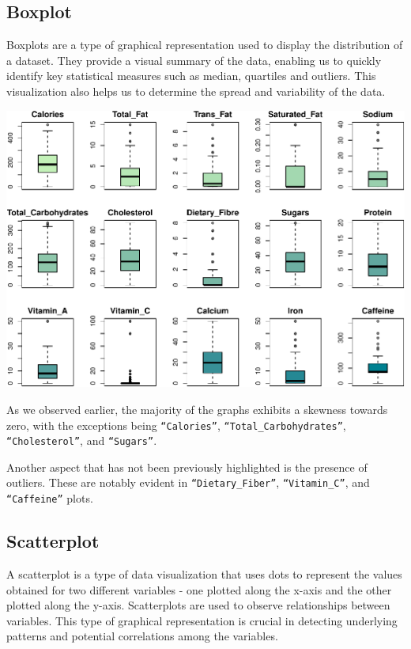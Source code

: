 \documentclass[
]{article}
\begin{document}
\subsection{Boxplot}\label{boxplot}

Boxplots are a type of graphical representation used to display the
distribution of a dataset. They provide a visual summary of the data,
enabling us to quickly identify key statistical measures such as median,
quartiles and outliers. This visualization also helps us to determine
the spread and variability of the data.

\begin{center}\includegraphics{Statistical_Learning_Final_Report_files/figure-latex/boxplot-1} \end{center}

As we observed earlier, the majority of the graphs exhibits a skewness
towards zero, with the exceptions being \texttt{“Calories”},
\texttt{“Total\_Carbohydrates”}, \texttt{“Cholesterol”}, and
\texttt{“Sugars”}.

Another aspect that has not been previously highlighted is the presence
of outliers. These are notably evident in \texttt{“Dietary\_Fiber”},
\texttt{“Vitamin\_C”}, and \texttt{“Caffeine”} plots.

\subsection{Scatterplot}\label{scatterplot}

A scatterplot is a type of data visualization that uses dots to
represent the values obtained for two different variables - one plotted
along the x-axis and the other plotted along the y-axis. Scatterplots
are used to observe relationships between variables. This type of
graphical representation is crucial in detecting underlying patterns and
potential correlations among the variables.
\end{document}
